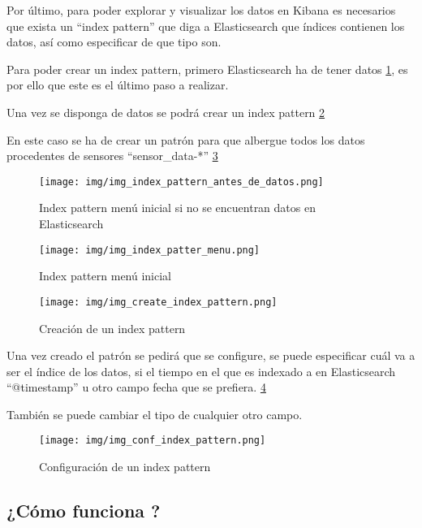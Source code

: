 Por último, para poder explorar y visualizar los datos en Kibana es necesarios que exista un ``index pattern'' que diga a Elasticsearch que índices contienen los datos, así como especificar de que tipo son. \cite{pagina:elastic}

Para poder crear un index pattern, primero Elasticsearch ha de tener datos \ref{img_index_pattern_antes_de_datos.png}, es por ello que este es el último paso a realizar.

Una vez se disponga de datos se podrá crear un index pattern \ref{img_index_patter_menu.png}

En este caso se ha de crear un patrón para que albergue todos los datos procedentes de sensores ``sensor\_data-*'' \ref{img_create_index_pattern.png}

\begin{figure}[h]
	\centering
	\texttt{[image: img/img\_index\_pattern\_antes\_de\_datos.png]}
	\caption{Index pattern menú inicial si no se encuentran datos en Elasticsearch}
	\label{img_index_pattern_antes_de_datos.png}
\end{figure}

\begin{figure}[h]
	\centering
	\texttt{[image: img/img\_index\_patter\_menu.png]}
	\caption{Index pattern menú inicial}
	\label{img_index_patter_menu.png}
\end{figure}

\begin{figure}[h]
	\centering
	\texttt{[image: img/img\_create\_index\_pattern.png]}
	\caption{Creación de un index pattern}
	\label{img_create_index_pattern.png}
\end{figure}

Una vez creado el patrón se pedirá que se configure, se puede especificar cuál va a ser el índice de los datos, si el tiempo en el que es indexado a en Elasticsearch ``@timestamp'' u otro campo fecha que se prefiera. \ref{img_conf_index_pattern.png}

También se puede cambiar el tipo de cualquier otro campo. 

\begin{figure}[h]
	\centering
	\texttt{[image: img/img\_conf\_index\_pattern.png]}
	\caption{Configuración de un index pattern}
	\label{img_conf_index_pattern.png}
\end{figure}

\clearpage

\subsection{¿Cómo funciona \nombrePrograma?}

